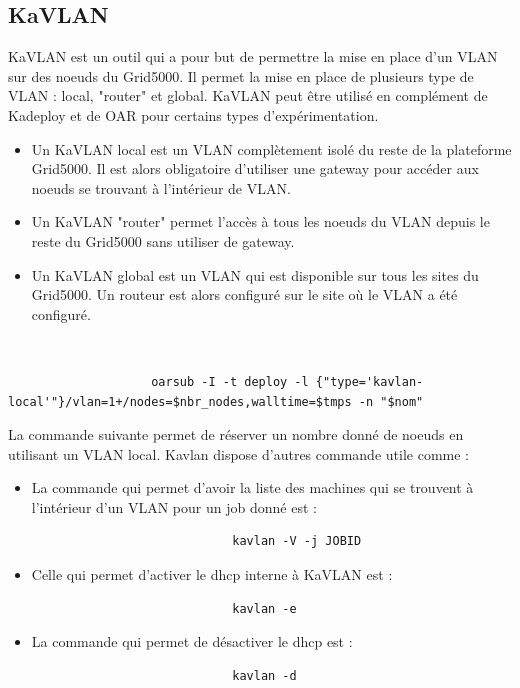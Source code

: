 \documentclass[a4paper, 10pt, onecolumn]{report}
\begin{document}
		\subsection{KaVLAN}
			KaVLAN est un outil qui a pour but de permettre la mise en place d'un VLAN sur des noeuds du Grid5000. Il permet la mise en place de plusieurs type de VLAN : local, "router" et global. KaVLAN peut être utilisé en complément de Kadeploy et de OAR pour certains types d'expérimentation.\\
			\begin{itemize}
  				\item Un KaVLAN local est un VLAN complètement isolé du reste de la plateforme Grid5000. Il est alors obligatoire d'utiliser une gateway pour accéder aux noeuds se trouvant à l'intérieur de VLAN.
  				\item Un KaVLAN "router" permet l'accès à tous les noeuds du VLAN depuis le reste du Grid5000 sans utiliser de gateway.
 				 \item Un KaVLAN global est un VLAN qui est disponible sur tous les sites du Grid5000. Un routeur est alors configuré sur le site où le VLAN a été configuré.\\
			\end{itemize}
			\\ 
			\begin{lstlisting}
					oarsub -I -t deploy -l {"type='kavlan-local'"}/vlan=1+/nodes=$nbr_nodes,walltime=$tmps -n "$nom"
			\end{lstlisting}
			La commande suivante permet de réserver un nombre donné de noeuds en utilisant un VLAN local.
			Kavlan dispose d'autres commande utile comme : \\
				\begin{itemize}
					\item La commande qui  permet d'avoir la liste des machines qui se trouvent à l'intérieur d'un VLAN pour un job donné est :
						\begin{lstlisting}
							kavlan -V -j JOBID
						\end{lstlisting}
					\item Celle qui permet d'activer le dhcp interne à KaVLAN est : 
					 	\begin{lstlisting}
							kavlan -e
						\end{lstlisting}
					\item La commande qui permet de désactiver le dhcp est : 
						\begin{lstlisting}
							kavlan -d
						\end{lstlisting}
					\end{itemize}
\end{document}
